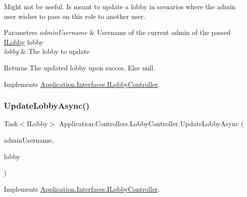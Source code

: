 Might not be useful. Is meant to update a lobby in scenarios where the admin user wishes to pass on this role to another user. 


\begin{DoxyParams}{Parameters}
{\em admin\+Username} & Username of the current admin of the passed \mbox{\hyperlink{}{I\+Lobby}} lobby\\
\hline
{\em lobby} & The lobby to update\\
\hline
\end{DoxyParams}
\begin{DoxyReturn}{Returns}
The updated lobby upon succes. Else null.
\end{DoxyReturn}


Implements \mbox{\hyperlink{interface_application_1_1_interfaces_1_1_i_lobby_controller_a4d0618e880423f15785360453bf90f90}{Application.\+Interfaces.\+I\+Lobby\+Controller}}.

\mbox{\label{class_application_1_1_controllers_1_1_lobby_controller_a2f30842e0480f28ddbe51ab420b35049}} 
\subsubsection{\texorpdfstring{Update\+Lobby\+Async()}{UpdateLobbyAsync()}}
{\footnotesize\ttfamily Task$<$I\+Lobby$>$ Application.\+Controllers.\+Lobby\+Controller.\+Update\+Lobby\+Async (\begin{DoxyParamCaption}\item[{string}]{admin\+Username,  }\item[{I\+Lobby}]{lobby }\end{DoxyParamCaption})}



Implements \mbox{\hyperlink{interface_application_1_1_interfaces_1_1_i_lobby_controller_a40457a8fb8d6801a8e42f1e75f9d3480}{Application.\+Interfaces.\+I\+Lobby\+Controller}}.

\mbox{\label{class_application_1_1_controllers_1_1_lobby_controller_a3b6eb2c76ba2d3d96ddec5c56ab2abc2}} 

